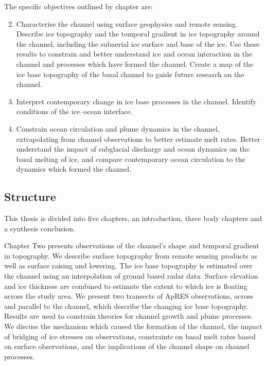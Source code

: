 The specific objectives outlined by chapter are:
\begin{enumerate}
    \setcounter{enumi}{1}
    \item Characterise the channel using surface geophysics and remote sensing. Describe ice topography and the temporal gradient in ice topography around the channel, including the subaerial ice surface and base of the ice. Use these results to constrain and better understand ice and ocean interaction in the channel and processes which have formed the channel. Create a map of the ice base topography of the basal channel to guide future research on the channel.
    \item Interpret contemporary change in ice base processes in the channel. Identify conditions of the ice--ocean interface. 
    \item Constrain ocean circulation and plume dynamics in the channel, extrapolating from channel observations to better estimate melt rates. Better understand the impact of subglacial discharge and ocean dynamics on the basal melting of ice, and compare contemporary ocean circulation to the dynamics which formed the channel. 
\end{enumerate}


\subsection{Structure} \label{sec:structure}


This thesis is divided into five chapters, an introduction, three body chapters and a synthesis conclusion. 
 
Chapter Two presents observations of the channel's shape and temporal gradient in topography. We describe surface topography  from remote sensing products as well as surface raising and lowering. The ice base topography is estimated over the channel using an interpolation of ground based radar data. Surface elevation and ice thickness are combined to estimate the extent to which ice is floating across the study area.  We present two transects of ApRES observations, across and parallel to the channel, which describe the changing ice base topography.   Results are used to constrain theories for channel growth and plume processes. We discuss the mechanism which caused the formation of the channel, the impact of bridging of ice stresses on observations, constraints on basal melt rates based on surface observations, and the implications of the channel shape on channel processes. 


